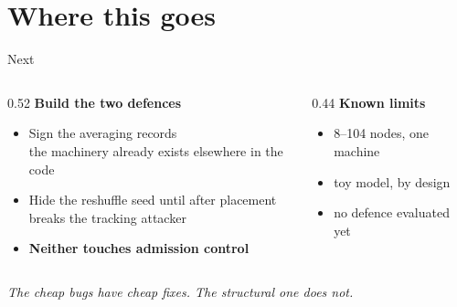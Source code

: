\documentclass[aspectratio=169]{beamer}
\begin{document}
\section{Where this goes}

\begin{frame}{Next}
\vspace{4mm}
\begin{columns}[T]
    \begin{column}{0.52\textwidth}
        {\large\bfseries Build the two defences}
        \vspace{3mm}
        \begin{itemize}
            \setlength{\itemsep}{3mm}
            \item[\textcolor{dat}{$\blacksquare$}] {\small Sign the averaging records\\
                  {\scriptsize\color{ChalmersGrey}the machinery already exists elsewhere in the code}}
            \item[\textcolor{dat}{$\blacksquare$}] {\small Hide the reshuffle seed until after placement\\
                  {\scriptsize\color{ChalmersGrey}breaks the tracking attacker}}
            \item[\textcolor{ctl}{$\blacksquare$}] {\small \textbf{Neither touches admission control}}
        \end{itemize}
    \end{column}
    \begin{column}{0.44\textwidth}
        {\large\bfseries Known limits}
        \vspace{3mm}
        \begin{itemize}
            \setlength{\itemsep}{3mm}
            \item {\small 8--104 nodes, one machine}
            \item {\small toy model, by design}
            \item {\small no defence evaluated yet}
        \end{itemize}
    \end{column}
\end{columns}

\vspace{7mm}
\centering
{\small\itshape The cheap bugs have cheap fixes.\quad
 \textcolor{ctl}{The structural one does not.}}
\end{frame}
\end{document}

